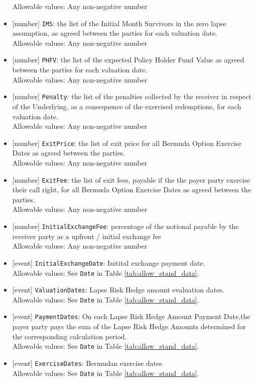 \begin{itemize}
  Allowable values: Any non-negative number
  \item{}[number] \lstinline!IMS!: the list of the Initial Month Survivors in the zero lapse assumption, as agreed between the parties for each valuation date. \\
  Allowable values: Any non-negative number
  \item{}[number] \lstinline!PHFV!: the list of the  expected  Policy  Holder  Fund  Value  as  agreed between the parties for each valuation date.  \\
  Allowable values: Any non-negative number
  \item{}[number] \lstinline!Penalty!: the list of the penalties collected  by the receiver in  respect  of  the Underlying, as a consequence of the exercised redemptions, for each valuation date.  \\
  Allowable values: Any non-negative number
  \item{}[number] \lstinline!ExitPrice!: the list of exit price for all Bermuda Option Exercise Dates as agreed between the parties.   \\
  Allowable values: Any non-negative number
  \item{}[number] \lstinline!ExitFee!:  the list of exit fees, payable if the the payer party exercise their call right, for all Bermuda Option Exercise Dates as agreed between the parties. \\
  Allowable values: Any non-negative number
  \item{}[number] \lstinline!InitialExchangeFee!: percentage of the notional payable by the receiver party as a upfront / initial exchange fee \\
  Allowable values: Any non-negative number
  \item{}[event] \lstinline!InitialExchangeDate!: Initital exchange payment date. \\
  Allowable values: See \lstinline!Date! in Table \ref{tab:allow_stand_data}.
  \item{}[event] \lstinline!ValuationDates!: Lapse Risk Hedge amount evaluation dates. \\
  Allowable values: See \lstinline!Date! in Table \ref{tab:allow_stand_data}.
  \item{}[event] \lstinline!PaymentDates!: On  each Lapse  Risk  Hedge Amount Payment Date,the payer party pays the sum of the Lapse Risk Hedge Amounts determined for the corresponding calculation period. \\
  Allowable values: See \lstinline!Date! in Table \ref{tab:allow_stand_data}.
  \item{}[event] \lstinline!ExerciseDates!: Bermudan exercise dates \\
  Allowable values: See \lstinline!Date! in Table \ref{tab:allow_stand_data}.
\end{itemize}

\clearpage
